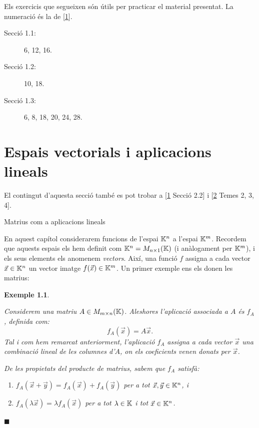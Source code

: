 \documentclass[
  11pt,
]{book}
\makeatletter
\numberwithin{dummy}{section}
\theoremstyle{maincolornumbox}
\theoremstyle{blacknumex}
\newtheorem{exampleT}{Exemple}[chapter]
\theoremstyle{blacknumbox}
\theoremstyle{maincolornum}
\newenvironment{example}{\begin{exampleT}}{\hfill{\tiny\ensuremath{\blacksquare}}\end{exampleT}}
\renewcommand{\section}{\@startsection{section}{1}{\z@}
{-4ex \@plus -1ex \@minus -.4ex}
{1ex \@plus.2ex }
{\normalfont\large\sffamily\bfseries}}
\newlength\esp
\makeatother
\begin{document}
Els exercicis que segueixen són útils per practicar el material
presentat. La numeració és la de {[}\protect\hyperlink{ref-Bret}{1}{]}.

\begin{description}
\item[Secció 1.1:]
6, 12, 16.
\item[Secció 1.2:]
10, 18.
\item[Secció 1.3:]
6, 8, 18, 20, 24, 28.
\end{description}

\hypertarget{espais-vectorials-i-aplicacions-lineals}{%
\chapter{Espais vectorials i aplicacions lineals}\label{espais-vectorials-i-aplicacions-lineals}}

El contingut d'aquesta secció també es pot trobar a {[}\protect\hyperlink{ref-Bret}{1} Secció 2.2{]} i
{[}\protect\hyperlink{ref-NaXa}{2} Temes 2, 3, 4{]}.

\hypertarget{subsec:matriusapl}{%
\section{Matrius com a aplicacions lineals}\label{subsec:matriusapl}}

En aquest capítol considerarem funcions de l'espai \(\mathbb{K}^n\) a l'espai
\(\mathbb{K}^m\). Recordem que aquests espais els hem definit com
\(\mathbb{K}^n=M_{n\times 1}(\mathbb{K})\) (i anàlogament per \(\mathbb{K}^m\)), i els seus elements
els anomenem \emph{vectors}. Així, una funció \(f\) assigna a cada vector
\(\vec x\in \mathbb{K}^n\) un vector imatge \(f(\vec x)\in \mathbb{K}^m\). Un primer exemple
ens els donen les matrius:

\begin{example}
\protect\hypertarget{exm:Alineal}{}\label{exm:Alineal}

Considerem una matriu
\(A\in M_{m\times n}(\mathbb{K})\). Aleshores l'aplicació associada a \(A\) és
\(f_A\), definida com: \[f_A(\vec x) = A\vec x.\] Tal i com hem remarcat
anteriorment, l'aplicació \(f_A\) assigna a cada vector \(\vec x\) una
combinació lineal de les columnes d'\(A\), on els coeficients venen donats
per \(\vec x\).

De les propietats del producte de matrius, sabem que \(f_A\) satisfà:

\begin{enumerate}
\def\labelenumi{\arabic{enumi}.}
\item
  \(f_A(\vec x+\vec y) = f_A(\vec x) + f_A(\vec y)\) per a tot
  \(\vec x, \vec y \in \mathbb{K}^n\), i
\item
  \(f_A(\lambda \vec x) = \lambda f_A(\vec x)\) per a tot \(\lambda\in\mathbb{K}\)
  i tot \(\vec x\in \mathbb{K}^n\).
\end{enumerate}

\end{example}
\end{document}

